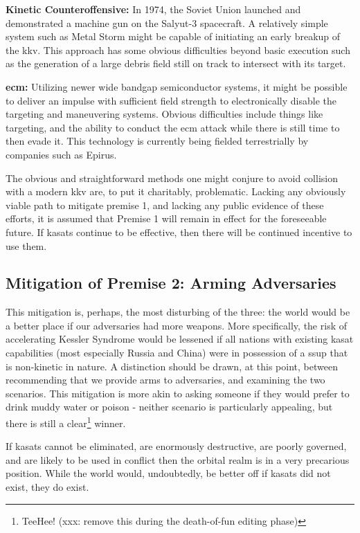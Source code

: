 \textbf{Kinetic Counteroffensive:} In 1974, the Soviet Union launched
and demonstrated a machine gun on the Salyut-3 spacecraft.\cite{xxx} A
relatively simple system such as Metal Storm might be capable of
initiating an early breakup of the \ac{kkv}.  This approach has some
obvious difficulties beyond basic execution such as the generation of
a large debris field still on track to intersect with its target.

\textbf{\acf{ecm}:} Utilizing newer wide bandgap semiconductor
systems, it might be possible to deliver an impulse with sufficient
field strength to electronically disable the  targeting and
maneuvering systems.  Obvious difficulties include things like
targeting, and the ability to conduct the \ac{ecm} attack while there
is still time to then evade it.  This technology is currently being
fielded terrestrially by companies such as Epirus.\cite{epirus}

The obvious and straightforward methods one might conjure to avoid
collision with a modern \ac{kkv} are, to put it charitably,
problematic.  Lacking any obviously viable path to mitigate premise 1,
and lacking any public evidence of these efforts, it is assumed that
Premise 1 will remain in effect for the foreseeable future.  If
\acp{kasat} continue to be effective, then there will be continued
incentive to use them.

\subsection{Mitigation of Premise 2: Arming Adversaries}
This mitigation is, perhaps, the most disturbing of the three: the
world would be a better place if our adversaries had more weapons.
More specifically, the risk of accelerating Kessler Syndrome would be
lessened if all nations with existing \ac{kasat} capabilities (most
especially Russia and China) were in possession of a \acf{ssup} that
is non-kinetic in nature.  A distinction should be drawn, at this
point, between recommending that we provide arms to adversaries, and
examining the two scenarios.  This mitigation is more akin to asking
someone if they would prefer to drink muddy water or poison - neither
scenario is particularly appealing, but there is still a
clear\footnote{TeeHee! (xxx: remove this during the death-of-fun
editing phase)} winner.

If \acp{kasat} cannot be eliminated, are enormously destructive, are
poorly governed, and are likely to be used in conflict then the
orbital realm is in a very precarious position.  While the world
would, undoubtedly, be better off if \acp{kasat} did not exist, they
do exist.

